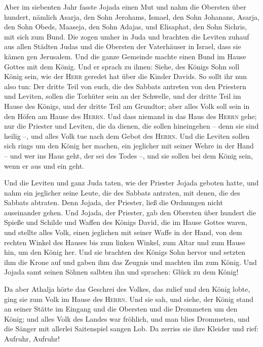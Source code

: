  Aber im siebenten Jahr fasste Jojada einen Mut und nahm
die Obersten über hundert, nämlich Asarja, den Sohn Jerohams, Ismael,
den Sohn Johanans, Asarja, den Sohn Obeds, Maaseja, den Sohn Adajas, und
Elisaphat, den Sohn Sichris, mit sich zum Bund.  Die zogen
umher in Juda und brachten die Leviten zuhauf aus allen Städten Judas
und die Obersten der Vaterhäuser in Israel, dass sie kämen gen
Jerusalem.  Und die ganze Gemeinde machte einen Bund im
Hause Gottes mit dem König. Und er sprach zu ihnen: Siehe, des Königs
Sohn soll König sein, wie der \textsc{Herr} geredet hat über die Kinder
Davids.  So sollt ihr nun also tun: Der dritte Teil von
euch, die des Sabbats antreten von den Priestern und Leviten, sollen die
Torhüter sein an der Schwelle,  und der dritte Teil im
Hause des Königs, und der dritte Teil am Grundtor; aber alles Volk soll
sein in den Höfen am Hause des \textsc{Herrn}.  Und dass
niemand in das Haus des \textsc{Herrn} gehe; nur die Priester und
Leviten, die da dienen, die sollen hineingehen -- denn sie sind heilig
--, und alles Volk tue nach dem Gebot des \textsc{Herrn}. 
Und die Leviten sollen sich rings um den König her machen, ein jeglicher
mit seiner Wehre in der Hand -- und wer ins Haus geht, der sei des Todes
--, und sie sollen bei dem König sein, wenn er aus und ein geht.

 Und die Leviten und ganz Juda taten, wie der Priester
Jojada geboten hatte, und nahm ein jeglicher seine Leute, die des
Sabbats antraten, mit denen, die des Sabbats abtraten. Denn Jojada, der
Priester, ließ die Ordnungen nicht auseinander gehen.  Und
Jojada, der Priester, gab den Obersten über hundert die Spieße und
Schilde und Waffen des Königs David, die im Hause Gottes waren,
 und stellte alles Volk, einen jeglichen mit seiner Waffe
in der Hand, von dem rechten Winkel des Hauses bis zum linken Winkel,
zum Altar und zum Hause hin, um den König her.  Und sie
brachten des Königs Sohn hervor und setzten ihm die Krone auf und gaben
ihm das Zeugnis und machten ihn zum König. Und Jojada samt seinen Söhnen
salbten ihn und sprachen: Glück zu dem König!

 Da aber Athalja hörte das Geschrei des Volkes, das
zulief und den König lobte, ging sie zum Volk im Hause des
\textsc{Herrn}.  Und sie sah, und siehe, der König stand
an seiner Stätte im Eingang und die Obersten und die Drommeten um den
König; und alles Volk des Landes war fröhlich, und man blies Drommeten,
und die Sänger mit allerlei Saitenspiel sangen Lob. Da zerriss sie ihre
Kleider und rief: Aufruhr, Aufruhr!

